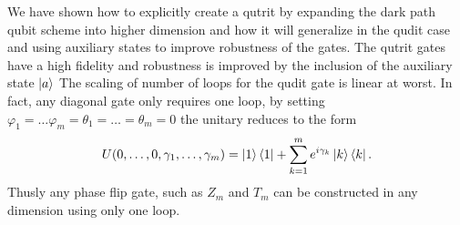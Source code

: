 We have shown how to explicitly create a qutrit by expanding the dark path qubit scheme\cite{darkpath} into higher dimension and how it will generalize in the qudit case and using auxiliary states to improve robustness of the gates.
The qutrit gates have a high fidelity and robustness is improved by the inclusion of the auxiliary state $\ket{a}$
The scaling of number of loops for the qudit gate is linear at worst. In fact, any diagonal gate only requires one loop, by setting $\varphi_1 = \dots \varphi_m = \theta_1 = \dots = \theta_m = 0$ the unitary reduces to the form 
\begin{equation}
U(0,\dots,0,\gamma_1,\dots,\gamma_m) = \ket{1}\bra{1} + \sum_{k = 1}^m e^{i\gamma_k}\ket{k}\bra{k}.
\end{equation}
Thusly any phase flip gate, such as $Z_m$ and $T_m$ can be constructed in any dimension using only one loop.